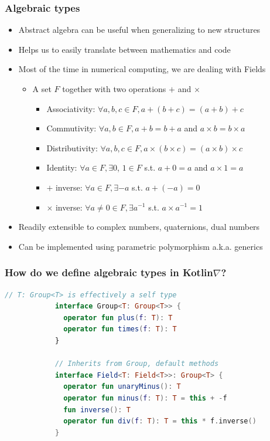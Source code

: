 \documentclass{beamer}
\begin{document}
    \begin{frame}
        \frametitle{Algebraic types}
        \begin{itemize}
            \item Abstract algebra can be useful when generalizing to new structures
            \item Helps us to easily translate between mathematics and code
            \item Most of the time in numerical computing, we are dealing with Fields
            \begin{itemize}
                \item A set $F$ together with two operations $+$ and $\times$
                \begin{itemize}
                    \item Associativity: $\forall a, b, c \in F, a + (b + c) = (a + b) + c$
                    \item Commutivity: $\forall a, b \in F, a + b = b + a$ and $a\times b = b\times a$
                    \item Distributivity: $\forall a, b, c \in F, a \times (b \times c) = (a \times b) \times c$
                    \item Identity: $\forall a \in F, \exists 0$, $ 1 \in F$ s.t. $a + 0 = a$ and $a\times 1= a$
                    \item $+$ inverse: $\forall a\in F, \exists -a$ s.t. $a + (-a) = 0$
                    \item $\times$ inverse: $\forall a\neq 0 \in F, \exists a^{-1}$ s.t. $a \times a^{-1} = 1$
                \end{itemize}
            \end{itemize}
            \item Readily extensible to complex numbers, quaternions, dual numbers
            \item Can be implemented using parametric polymorphism a.k.a. generics
        \end{itemize}
    \end{frame}


    \begin{frame}[fragile]
        \frametitle{How do we define algebraic types in Kotlin\texorpdfstring{$\nabla$}{}?}
        \begin{lstlisting}[language=Kotlin, gobble=12]
            // T: Group<T> is effectively a self type
            interface Group<T: Group<T>> {
              operator fun plus(f: T): T
              operator fun times(f: T): T
            }

            // Inherits from Group, default methods
            interface Field<T: Field<T>>: Group<T> {
              operator fun unaryMinus(): T
              operator fun minus(f: T): T = this + -f
              fun inverse(): T
              operator fun div(f: T): T = this * f.inverse()
            }
        \end{lstlisting}
    \end{frame}
\end{document}
